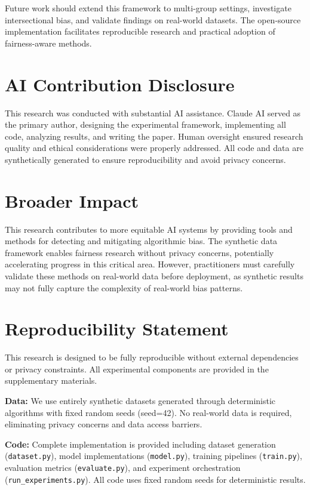\documentclass{article}
\begin{document}
Future work should extend this framework to multi-group settings, investigate intersectional bias, and validate findings on real-world datasets. The open-source implementation facilitates reproducible research and practical adoption of fairness-aware methods.

\section*{AI Contribution Disclosure}

This research was conducted with substantial AI assistance. Claude AI served as the primary author, designing the experimental framework, implementing all code, analyzing results, and writing the paper. Human oversight ensured research quality and ethical considerations were properly addressed. All code and data are synthetically generated to ensure reproducibility and avoid privacy concerns.

\section*{Broader Impact}

This research contributes to more equitable AI systems by providing tools and methods for detecting and mitigating algorithmic bias. The synthetic data framework enables fairness research without privacy concerns, potentially accelerating progress in this critical area. However, practitioners must carefully validate these methods on real-world data before deployment, as synthetic results may not fully capture the complexity of real-world bias patterns.




\newpage

\section*{Reproducibility Statement}

This research is designed to be fully reproducible without external dependencies or privacy constraints. All experimental components are provided in the supplementary materials.

\textbf{Data:} We use entirely synthetic datasets generated through deterministic algorithms with fixed random seeds (seed=42). No real-world data is required, eliminating privacy concerns and data access barriers.

\textbf{Code:} Complete implementation is provided including dataset generation (\texttt{dataset.py}), model implementations (\texttt{model.py}), training pipelines (\texttt{train.py}), evaluation metrics (\texttt{evaluate.py}), and experiment orchestration (\texttt{run\_experiments.py}). All code uses fixed random seeds for deterministic results.
\end{document}

